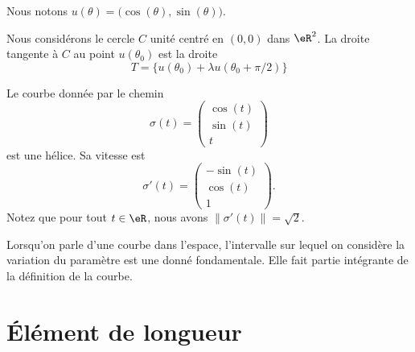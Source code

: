Nous notons \( u(\theta)=\big( \cos(\theta),\sin(\theta) \big)\).

\begin{proposition}	\label{PROPooUVCPooKEEkrZ}
	Nous considérons le cercle \( C\) unité centré en \( (0,0)\) dans \( \eR^2\). La droite tangente à \( C\) au point \( u(\theta_0)\) est la droite
	\begin{equation}
		T=\{ u(\theta_0)+\lambda u(\theta_0+\pi/2) \}
	\end{equation}
\end{proposition}


\begin{example}
	Le courbe donnée par le chemin
	\begin{equation}
		\sigma(t)=\begin{pmatrix}
			\cos(t) \\
			\sin(t) \\
			t
		\end{pmatrix}
	\end{equation}
	est une hélice. Sa vitesse est
	\begin{equation}
		\sigma'(t)=\begin{pmatrix}
			-\sin(t) \\
			\cos(t)  \\
			1
		\end{pmatrix}.
	\end{equation}
	Notez que pour tout \( t\in\eR\), nous avons \( \| \sigma'(t) \|=\sqrt{2}\).
\end{example}

\begin{remark}
	Lorsqu'on parle d'une courbe dans l'espace, l'intervalle sur lequel on considère la variation du paramètre est une donné fondamentale. Elle fait partie intégrante de la définition de la courbe.
\end{remark}


\section{Élément de longueur}

